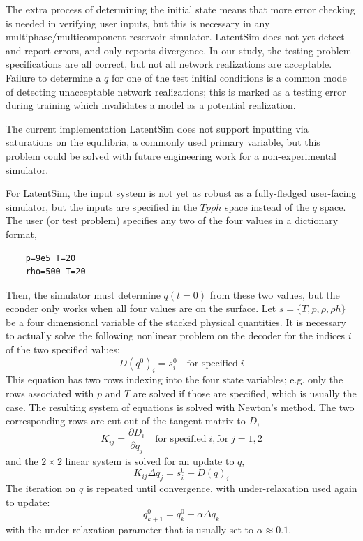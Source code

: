 \documentclass[AMA,STIX1COL]{WileyNJD-v2}
\begin{document}
The extra process of determining the initial state means that more error checking is needed
in verifying user inputs, but this is necessary in any
multiphase/multicomponent reservoir simulator. LatentSim does not yet
detect and report errors, and only reports divergence. In our study, the
testing problem specifications are all correct, but not all network
realizations are acceptable. Failure to determine a \(q\) for one of the
test initial conditions is a common mode of detecting unacceptable
network realizations; this is marked as a testing error during training
which invalidates a model as a potential realization.

The current implementation LatentSim does not support inputting via
saturations on the equilibria, a commonly used primary variable, but
this problem could be solved with future engineering work for a
non-experimental simulator.

For LatentSim, the input system is not yet as robust as a
fully-fledged user-facing simulator, but the inputs are specified in
the $T p \rho h$ space instead of the $q$ space.
The user (or test problem) specifies any two of the four values in a
dictionary format,
\begin{verbatim}
    p=9e5 T=20
    rho=500 T=20
\end{verbatim}
Then, the simulator must determine $q(t=0)$ from these two
values, but the econder only works when all four values are on the
surface. Let $s=\{T,p,\rho,\rho h\}$ be a four dimensional
variable of the stacked physical quantities. It is necessary to
actually solve the following nonlinear problem
on the decoder for the indices $i$ of the two specified values:
\begin{equation}
  D(q^0)_i = s^0_i \quad \text{for specified}\; i
\end{equation}
This equation has two rows indexing into the four state variables;
e.g. only the rows associated with $p$ and $T$ are solved if those are
specified, which is usually the case. The resulting system of
equations is solved with Newton's method. The two corresponding rows are cut out of
the tangent matrix to $D$,
\begin{equation}
K_{ij} = \frac{\partial D_i}{\partial q_j}  \quad \text{for
    specified}\; i, \text{for}\;j=1,2
\end{equation}
and the $2\times2$ linear system is solved for an update to $q$,
\begin{equation}
K_{ij}\Delta q_j = s^0_i-D(q)_i
\end{equation}
The iteration on $q$ is repeated until convergence, with under-relaxation used again to update:
 \begin{equation}
q^0_{k+1} =q^0_{k} + \alpha \Delta q_{k}
\end{equation}
with the under-relaxation parameter that is usually set to $\alpha \approx
0.1$.
\end{document}
